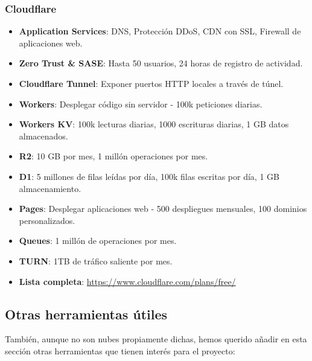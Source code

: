 \subsubsection*{Cloudflare}
\begin{itemize}
	\item \textbf{Application Services}: DNS, Protección DDoS, CDN con SSL, Firewall de aplicaciones web.
	\item \textbf{Zero Trust \& SASE}: Hasta 50 usuarios, 24 horas de registro de actividad.
	\item \textbf{Cloudflare Tunnel}: Exponer puertos HTTP locales a través de túnel.
	\item \textbf{Workers}: Desplegar código sin servidor - 100k peticiones diarias.
	\item \textbf{Workers KV}: 100k lecturas diarias, 1000 escrituras diarias, 1 GB datos almacenados.
	\item \textbf{R2}: 10 GB por mes, 1 millón operaciones por mes.
	\item \textbf{D1}: 5 millones de filas leídas por día, 100k filas escritas por día, 1 GB almacenamiento.
	\item \textbf{Pages}: Desplegar aplicaciones web - 500 despliegues mensuales, 100 dominios personalizados.
	\item \textbf{Queues}: 1 millón de operaciones por mes.
	\item \textbf{TURN}: 1TB de tráfico saliente por mes.
	\item \textbf{Lista completa}: \url{https://www.cloudflare.com/plans/free/}
\end{itemize}

\subsection{Otras herramientas útiles}

También, aunque no son nubes propiamente dichas, hemos querido añadir en esta sección otras herramientas que tienen interés para el proyecto:

